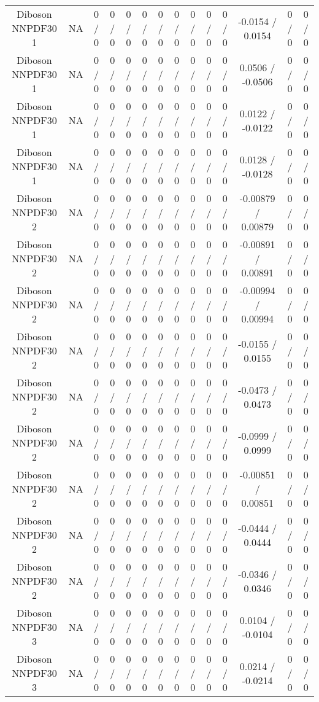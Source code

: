 \documentclass[10pt]{article}
\begin{document}
\begin{table}[htbp]
\begin{center}
\begin{tabular}{|c|c|c|c|c|c|c|c|c|c|c|c|c|c|}
  Diboson NNPDF30 1 &    NA    & 0 / 0 & 0 / 0 & 0 / 0 & 0 / 0 & 0 / 0 & 0 / 0 & 0 / 0 & 0 / 0 & 0 / 0 & -0.0154 / 0.0154 & 0 / 0 & 0 / 0 \\ 
  Diboson NNPDF30 1 &    NA    & 0 / 0 & 0 / 0 & 0 / 0 & 0 / 0 & 0 / 0 & 0 / 0 & 0 / 0 & 0 / 0 & 0 / 0 & 0.0506 / -0.0506 & 0 / 0 & 0 / 0 \\ 
  Diboson NNPDF30 1 &    NA    & 0 / 0 & 0 / 0 & 0 / 0 & 0 / 0 & 0 / 0 & 0 / 0 & 0 / 0 & 0 / 0 & 0 / 0 & 0.0122 / -0.0122 & 0 / 0 & 0 / 0 \\ 
  Diboson NNPDF30 1 &    NA    & 0 / 0 & 0 / 0 & 0 / 0 & 0 / 0 & 0 / 0 & 0 / 0 & 0 / 0 & 0 / 0 & 0 / 0 & 0.0128 / -0.0128 & 0 / 0 & 0 / 0 \\ 
  Diboson NNPDF30 2 &    NA    & 0 / 0 & 0 / 0 & 0 / 0 & 0 / 0 & 0 / 0 & 0 / 0 & 0 / 0 & 0 / 0 & 0 / 0 & -0.00879 / 0.00879 & 0 / 0 & 0 / 0 \\ 
  Diboson NNPDF30 2 &    NA    & 0 / 0 & 0 / 0 & 0 / 0 & 0 / 0 & 0 / 0 & 0 / 0 & 0 / 0 & 0 / 0 & 0 / 0 & -0.00891 / 0.00891 & 0 / 0 & 0 / 0 \\ 
  Diboson NNPDF30 2 &    NA    & 0 / 0 & 0 / 0 & 0 / 0 & 0 / 0 & 0 / 0 & 0 / 0 & 0 / 0 & 0 / 0 & 0 / 0 & -0.00994 / 0.00994 & 0 / 0 & 0 / 0 \\ 
  Diboson NNPDF30 2 &    NA    & 0 / 0 & 0 / 0 & 0 / 0 & 0 / 0 & 0 / 0 & 0 / 0 & 0 / 0 & 0 / 0 & 0 / 0 & -0.0155 / 0.0155 & 0 / 0 & 0 / 0 \\ 
  Diboson NNPDF30 2 &    NA    & 0 / 0 & 0 / 0 & 0 / 0 & 0 / 0 & 0 / 0 & 0 / 0 & 0 / 0 & 0 / 0 & 0 / 0 & -0.0473 / 0.0473 & 0 / 0 & 0 / 0 \\ 
  Diboson NNPDF30 2 &    NA    & 0 / 0 & 0 / 0 & 0 / 0 & 0 / 0 & 0 / 0 & 0 / 0 & 0 / 0 & 0 / 0 & 0 / 0 & -0.0999 / 0.0999 & 0 / 0 & 0 / 0 \\ 
  Diboson NNPDF30 2 &    NA    & 0 / 0 & 0 / 0 & 0 / 0 & 0 / 0 & 0 / 0 & 0 / 0 & 0 / 0 & 0 / 0 & 0 / 0 & -0.00851 / 0.00851 & 0 / 0 & 0 / 0 \\ 
  Diboson NNPDF30 2 &    NA    & 0 / 0 & 0 / 0 & 0 / 0 & 0 / 0 & 0 / 0 & 0 / 0 & 0 / 0 & 0 / 0 & 0 / 0 & -0.0444 / 0.0444 & 0 / 0 & 0 / 0 \\ 
  Diboson NNPDF30 2 &    NA    & 0 / 0 & 0 / 0 & 0 / 0 & 0 / 0 & 0 / 0 & 0 / 0 & 0 / 0 & 0 / 0 & 0 / 0 & -0.0346 / 0.0346 & 0 / 0 & 0 / 0 \\ 
  Diboson NNPDF30 3 &    NA    & 0 / 0 & 0 / 0 & 0 / 0 & 0 / 0 & 0 / 0 & 0 / 0 & 0 / 0 & 0 / 0 & 0 / 0 & 0.0104 / -0.0104 & 0 / 0 & 0 / 0 \\ 
  Diboson NNPDF30 3 &    NA    & 0 / 0 & 0 / 0 & 0 / 0 & 0 / 0 & 0 / 0 & 0 / 0 & 0 / 0 & 0 / 0 & 0 / 0 & 0.0214 / -0.0214 & 0 / 0 & 0 / 0 \\ 

\end{tabular}
\end{center}
\end{table}
\end{document}
